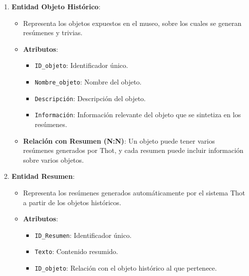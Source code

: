 \documentclass{report}
\begin{document}
\begin{enumerate}
    \item \textbf{Entidad Objeto Histórico}:
    \begin{itemize}
        \item Representa los objetos expuestos en el museo, sobre los cuales se generan resúmenes y trivias.
        \item \textbf{Atributos}:
        \begin{itemize}
            \item \texttt{ID\_objeto}: Identificador único.
            \item \texttt{Nombre\_objeto}: Nombre del objeto.
            \item \texttt{Descripción}: Descripción del objeto.
            \item \texttt{Información}: Información relevante del objeto que se sintetiza en los resúmenes.
        \end{itemize}
        \item \textbf{Relación con Resumen (N:N)}: Un objeto puede tener varios resúmenes generados por Thot, y cada resumen puede incluir información sobre varios objetos.
    \end{itemize}

    \item \textbf{Entidad Resumen}:
    \begin{itemize}
        \item Representa los resúmenes generados automáticamente por el sistema Thot a partir de los objetos históricos.
        \item \textbf{Atributos}:
        \begin{itemize}
            \item \texttt{ID\_Resumen}: Identificador único.
            \item \texttt{Texto}: Contenido resumido.
            \item \texttt{ID\_objeto}: Relación con el objeto histórico al que pertenece.
        \end{itemize}
    \end{itemize}
\end{enumerate}
\end{document}
